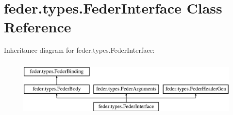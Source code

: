 \hypertarget{classfeder_1_1types_1_1FederInterface}{}\section{feder.\+types.\+Feder\+Interface Class Reference}
\label{classfeder_1_1types_1_1FederInterface}
Inheritance diagram for feder.\+types.\+Feder\+Interface\+:\begin{figure}[H]
\begin{center}
\leavevmode
\includegraphics[height=2.994653cm]{classfeder_1_1types_1_1FederInterface}
\end{center}
\end{figure}
